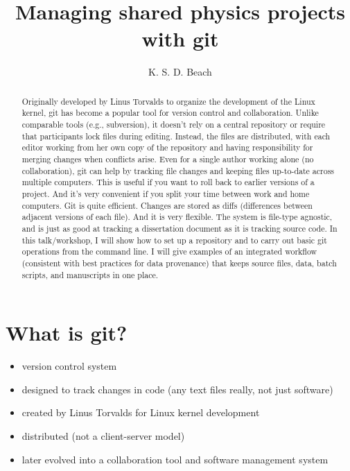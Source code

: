 \documentclass[aps,pra,twocolumn,groupaddress,showpacs]{revtex4-1}
\begin{document}
\title{Managing shared physics projects with git}

\author{K. S. D. Beach}

\begin{abstract}
Originally developed by Linus Torvalds to organize the development of the Linux kernel, git has become a popular tool for version control and collaboration. Unlike comparable tools (e.g., subversion), it doesn't rely on a central repository or require that participants lock files during editing. Instead, the files are distributed, with each editor working from her own copy of the repository and having responsibility for merging changes when conflicts arise. Even for a single author working alone (no collaboration), git can help by tracking file changes and keeping files up-to-date across multiple computers. This is useful if you want to roll back to earlier versions of a project. And it's very convenient if you split your time between work and home computers. Git is quite efficient. Changes are stored as diffs (differences between adjacent versions of each file). And it is very flexible. The system is file-type agnostic, and is just as good at tracking a dissertation document as it is tracking source code. In this talk/workshop, I will show how to set up a repository and to carry out basic git operations from the command line. I will give examples of an integrated workflow (consistent with best practices for data provenance) that keeps source files, data, batch scripts, and manuscripts in one place.
\end{abstract}

\maketitle

\section{What is git?}
\label{SECT:What-is-git}

\begin{itemize}
\item version control system
\item designed to track changes in code (any text files really, not just software) 
\item created by Linus Torvalds for Linux kernel development
\item distributed (not a client-server model)
\item later evolved into a collaboration tool and software management system
\end{itemize}
\end{document}
